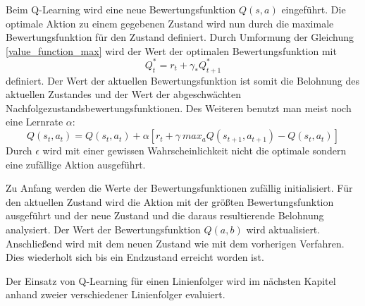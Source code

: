 Beim Q-Learning wird eine neue Bewertungsfunktion $Q(s, a)$ eingeführt. Die optimale Aktion zu einem gegebenen Zustand wird nun durch die maximale Bewertungsfunktion für den Zustand definiert. Durch Umformung der Gleichung \ref{value_function_max} wird der Wert der optimalen Bewertungsfunktion mit
\begin{equation}
	Q^{*}_t = r_t + \gamma_*Q^{*}_{t+1}
\end{equation} 
definiert. Der Wert der aktuellen Bewertungsfunktion ist somit die Belohnung des aktuellen Zustandes und der Wert der abgeschwächten Nachfolgezustandsbewertungsfunktionen. Des Weiteren benutzt man meist noch eine Lernrate $\alpha$:
\begin{equation}
	Q(s_t, a_t) = Q(s_t, a_t) + \alpha[r_t + \gamma \ max_a Q(s_{t+1}, a_{t+1}) - Q(s_t, a_t)]
\end{equation} \cite{Ertel_2013}
Durch $\epsilon$ wird mit einer gewissen Wahrscheinlichkeit nicht die optimale sondern eine zufällige Aktion ausgeführt.\par
Zu Anfang werden die Werte der Bewertungsfunktionen zufällig initialisiert. Für den aktuellen Zustand wird die Aktion mit der größten Bewertungsfunktion ausgeführt und der neue Zustand und die daraus resultierende Belohnung analysiert. Der Wert der Bewertungsfunktion $Q(a, b)$ wird aktualisiert. Anschließend wird mit dem neuen Zustand wie mit dem vorherigen Verfahren. Dies wiederholt sich bis ein Endzustand erreicht worden ist. \cite{Ertel_2013}\par
Der Einsatz von Q-Learning für einen Linienfolger wird im nächsten Kapitel anhand zweier verschiedener Linienfolger evaluiert.
